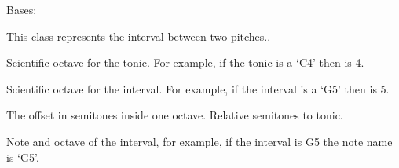 \documentclass[letterpaper,10pt,english]{sphinxmanual}
\begin{document}
\begin{fulllineitems}
\label{\detokenize{index:birdears.interval.Interval}}
Bases: 

This class represents the interval between two pitches..

\begin{fulllineitems}
\label{\detokenize{index:birdears.interval.Interval.tonic_octave}}
 \textendash{} Scientific octave for the tonic. For example, if
the tonic is a ‘C4’ then  is 4.

\end{fulllineitems}



\begin{fulllineitems}
 \textendash{} Scientific octave for the interval. For example,
if the interval is a ‘G5’ then  is 5.

\end{fulllineitems}


\begin{fulllineitems}
\label{\detokenize{index:birdears.interval.Interval.chromatic_offset}}
 \textendash{} The offset in semitones inside one octave.
Relative semitones to tonic.

\end{fulllineitems}


\begin{fulllineitems}
\label{\detokenize{index:birdears.interval.Interval.note_and_octave}}
 \textendash{} Note and octave of the interval, for example, if
the interval is G5 the note name is ‘G5’.

\end{fulllineitems}


\end{fulllineitems}
\end{document}
